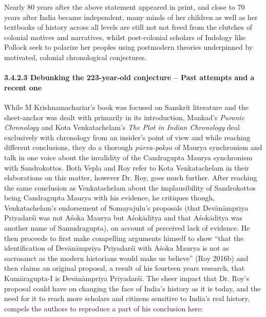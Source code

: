 Nearly 80 years after the above statement appeared in print, and close to 70 years after India became independent, many minds of her children as well as her textbooks of history across all levels are still not not freed from the clutches of colonial motives and narratives, whilst post-colonial scholars of Indology like Pollock seek to polarize her peoples using postmodern theories underpinned by motivated, colonial chronological conjectures.


\paragraph*{3.4.2.3 Debunking the 223-year-old conjecture – Past attempts and a recent one}

While M Krishnamachariar’s book was focused on Sanskrit literature and the sheet-anchor was dealt with primarily in its introduction, Mankad’s \textit{Puranic Chronology} and Kota Venkatachelam’s \textit{The Plot in Indian Chronology} deal exclusively with chronology from an insider’s point of view and while reaching different conclusions, they do a thorough \textit{pūrva-pakṣa} of Maurya synchronism and talk in one voice about the invalidity of the Candragupta Maurya synchronism with Sandrokottos. Both Vepla and Roy refer to Kota Venkatachelam in their elaborations on this matter, however Dr. Roy, goes much further. After reaching the same conclusion as Venkatachelam about the implausibility of Sandrokottos being Candragupta Maurya with his evidence, he critiques though, Venkatachelam’s endorsement of Somayajulu’s proposals (that Devānāmpriya Priyadarśī was not Aśoka Maurya but Aśokāditya and that Aśokāditya was another name of Samudragupta), on account of perceived lack of evidence. He then proceeds to first make compelling arguments himself to show “that the identification of Devānāmpriya Priyadarśī with Aśoka Maurya is not as sacrosanct as the modern historians would make us believe” (Roy 2016b) and then claims an original proposal, a result of his fourteen years research, that Kumāragupta-I is Devānāmpriya Priyadarśī. The sheer impact that Dr. Roy’s proposal could have on changing the face of India’s history as it is today, and the need for it to reach more scholars and citizens sensitive to India’s real history, compels the authors to reproduce a part of his conclusion here:

